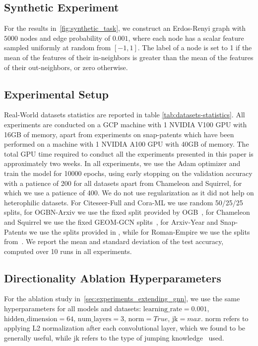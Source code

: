 \documentclass{article}
\theoremstyle{plain}
\theoremstyle{definition}
\theoremstyle{remark}
\begin{document}
\subsection{Synthetic Experiment}  \label{sec:appendix_synthetic_experiment}
For the results in~\cref{fig:synthetic_task}, we construct an Erdos-Renyi graph with $5000$ nodes and edge probability of $0.001$, where each node has a scalar feature sampled uniformly at random from $[-1, 1]$. The label of a node is set to 1 if the mean of the features of their in-neighbors is greater than the mean of the features of their out-neighbors, or zero otherwise. 

\subsection{Experimental Setup} \label{app:experimental_setup}
Real-World datasets statistics are reported in table \ref{tab:datasets-statistics}.
All experiments are conducted on a GCP machine with 1 NVIDIA V100 GPU with 16GB of memory, apart from experiments on snap-patents which have been performed on a machine with 1 NVIDIA A100 GPU with 40GB of memory. The total GPU time required to conduct all the experiments presented in this paper is approximately two weeks.
In all experiments, we use the Adam optimizer and train the model for 10000 epochs, using early stopping on the validation accuracy with a patience of 200 for all datasets apart from Chameleon and Squirrel, for which we use a patience of 400. We do not use regularization as it did not help on heterophilic datasets. For Citeseer-Full and Cora-ML we use random 50/25/25 splits, for OGBN-Arxiv we use the fixed split provided by OGB~\cite{hu2020ogb}, for Chameleon and Squirrel we use the fixed GEOM-GCN splits~\cite{pei2020geom}, for Arxiv-Year and Snap-Patents we use the splits provided in \citeauthor{lim2021large}, while for Roman-Empire we use the splits from~\citet{platonov2023a}. We report the mean and standard deviation of the test accuracy, computed over 10 runs in all experiments. 

\subsection{Directionality Ablation Hyperparameters} \label{sec:appendix_ablation_hyperparams}
For the ablation study in~\cref{sec:experiments_extending_gnn}, we use the same hyperparameters for all models and datasets: $\mathrm{learning\_rate} = 0.001$, $\mathrm{hidden\_dimension} = 64$, $\mathrm{num\_layers} = 3$, $\mathrm{norm} = True$, $\mathrm{jk}=max$. $\mathrm{norm}$ refers to applying L2 normalization after each convolutional layer, which we found to be generally useful, while $\mathrm{jk}$ refers to the type of jumping knowledge~\cite{pmlr-v80-xu18c} used.
\end{document}
